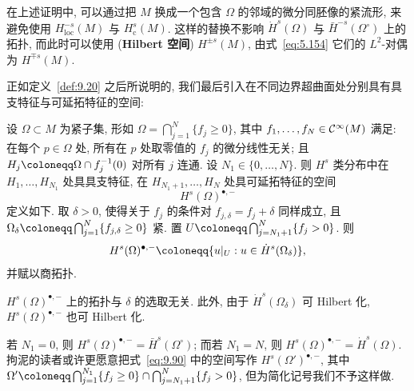 在上述证明中, 可以通过把 $M$ 换成一个包含 $\Omega$ 的邻域的微分同胚像的紧流形, 来避免使用 $H_{\mathrm{loc}}^{-s}(M)$ 与 $H_{\mathrm{c}}^s(M)$. 这样的替换不影响 $\dot{H}^s(\Omega)$ 与 $\bar{H}^{-s}(\Omega^\circ)$ 上的拓扑, 而此时可以使用 (\textbf{Hilbert 空间}) $H^{\pm s}(M)$, 由式~\eqref{eq:5.154} 它们的 $L^2$-对偶为 $H^{\mp s}(M)$.

正如定义~\ref{def:9.20} 之后所说明的, 我们最后引入在不同边界超曲面处分别具有具支特征与可延拓特征的空间:

\begin{definition}[混合空间]\label{def:9.28}
设 $\Omega \subset M$ 为紧子集, 形如 $\Omega = \bigcap_{j=1}^{N} \{f_j \ge 0\}$, 其中 $f_1, \ldots, f_N \in \mathcal{C}^\infty(M)$ 满足: 在每个 $p \in \Omega$ 处, 所有在 $p$ 处取零值的 $f_j$ 的微分线性无关; 且 $H_j \defeq \Omega \cap f_j^{-1}(0)$ 对所有 $j$ 连通. 设 $N_1 \in \{0, \ldots, N\}$. 则 $H^s$ 类分布中在 $H_1, \ldots, H_{N_1}$ 处具具支特征, 在 $H_{N_1+1}, \ldots, H_N$ 处具可延拓特征的空间
\begin{equation}\label{eq:9.89}
    H^s(\Omega)^{\bullet,-}
\end{equation}
定义如下. 取 $\delta > 0$, 使得关于 $f_j$ 的条件对 $f_{j,\delta} = f_j + \delta$ 同样成立, 且 $\Omega_\delta \defeq \bigcap_{j=1}^{N} \{f_{j,\delta} \ge 0\}$ 紧. 置 $U \defeq \bigcap_{j=N_1+1}^{N} \{f_j > 0\}$. 则
\begin{equation}\label{eq:9.90}
    H^s(\Omega)^{\bullet,-} \defeq \{u|_U : u \in \dot{H}^s(\Omega_\delta)\},
\end{equation}
并赋以商拓扑.
\end{definition}

$H^s(\Omega)^{\bullet,-}$ 上的拓扑与 $\delta$ 的选取无关. 此外, 由于 $\dot{H}^s(\Omega_\delta)$ 可 Hilbert 化, $H^s(\Omega)^{\bullet,-}$ 也可 Hilbert 化.

若 $N_1 = 0$, 则 $H^s(\Omega)^{\bullet,-} = \bar{H}^s(\Omega^\circ)$; 而若 $N_1 = N$, 则 $H^s(\Omega)^{\bullet,-} = \dot{H}^s(\Omega)$. 拘泥的读者或许更愿意把式~\eqref{eq:9.90} 中的空间写作 $H^s(\Omega')^{\bullet,-}$, 其中 $\Omega' \defeq \bigcap_{j=1}^{N_1} \{f_j \ge 0\} \cap \bigcap_{j=N_1+1}^{N} \{f_j > 0\}$, 但为简化记号我们不予这样做.

